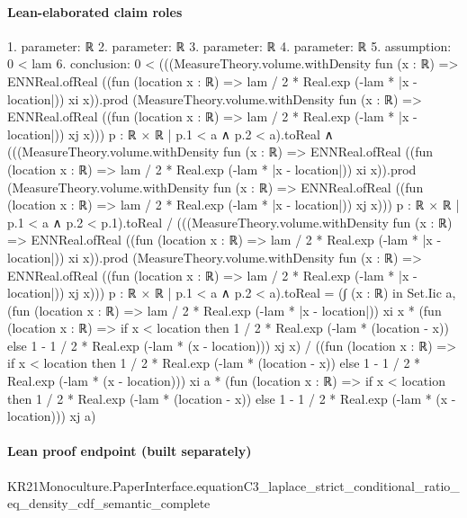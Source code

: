 \documentclass[10pt]{article}
\begin{document}
\paragraph{Lean-elaborated claim roles}\begin{ReviewVerbatim}
1. parameter: ℝ
2. parameter: ℝ
3. parameter: ℝ
4. parameter: ℝ
5. assumption: 0 < lam
6. conclusion: 0 <
    (((MeasureTheory.volume.withDensity fun (x : ℝ) =>
              ENNReal.ofReal ((fun (location x : ℝ) => lam / 2 * Real.exp (-lam * |x - location|)) xi x)).prod
          (MeasureTheory.volume.withDensity fun (x : ℝ) =>
            ENNReal.ofReal ((fun (location x : ℝ) => lam / 2 * Real.exp (-lam * |x - location|)) xj x)))
        {p : ℝ × ℝ | p.1 < a ∧ p.2 < a}).toReal ∧
  (((MeasureTheory.volume.withDensity fun (x : ℝ) =>
                ENNReal.ofReal ((fun (location x : ℝ) => lam / 2 * Real.exp (-lam * |x - location|)) xi x)).prod
            (MeasureTheory.volume.withDensity fun (x : ℝ) =>
              ENNReal.ofReal ((fun (location x : ℝ) => lam / 2 * Real.exp (-lam * |x - location|)) xj x)))
          {p : ℝ × ℝ | p.1 < a ∧ p.2 < p.1}).toReal /
      (((MeasureTheory.volume.withDensity fun (x : ℝ) =>
                ENNReal.ofReal ((fun (location x : ℝ) => lam / 2 * Real.exp (-lam * |x - location|)) xi x)).prod
            (MeasureTheory.volume.withDensity fun (x : ℝ) =>
              ENNReal.ofReal ((fun (location x : ℝ) => lam / 2 * Real.exp (-lam * |x - location|)) xj x)))
          {p : ℝ × ℝ | p.1 < a ∧ p.2 < a}).toReal =
    (∫ (x : ℝ) in Set.Iic a,
        (fun (location x : ℝ) => lam / 2 * Real.exp (-lam * |x - location|)) xi x *
          (fun (location x : ℝ) =>
              if x < location then 1 / 2 * Real.exp (-lam * (location - x))
              else 1 - 1 / 2 * Real.exp (-lam * (x - location)))
            xj x) /
      ((fun (location x : ℝ) =>
            if x < location then 1 / 2 * Real.exp (-lam * (location - x))
            else 1 - 1 / 2 * Real.exp (-lam * (x - location)))
          xi a *
        (fun (location x : ℝ) =>
            if x < location then 1 / 2 * Real.exp (-lam * (location - x))
            else 1 - 1 / 2 * Real.exp (-lam * (x - location)))
          xj a)
\end{ReviewVerbatim}

\paragraph{Lean proof endpoint (built separately)}\begin{ReviewVerbatim}
KR21Monoculture.PaperInterface.equationC3_laplace_strict_conditional_ratio_eq_density_cdf_semantic_complete
\end{ReviewVerbatim}
\end{document}
